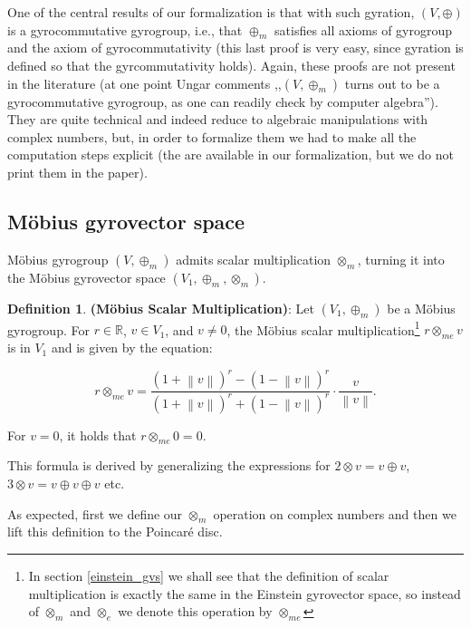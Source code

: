 \documentclass[a4paper]{article}
\theoremstyle{definition}
\newtheorem{definition}{Definition}[section]
\newcommand{\norm}[1]{\left\lVert#1\right\rVert}
\begin{document}
One of the central results of our formalization is that with such
gyration, $(V, \oplus)$ is a gyrocommutative gyrogroup, i.e., that
$\oplus_m$ satisfies all axioms of gyrogroup and the axiom of
gyrocommutativity (this last proof is very easy, since gyration is
defined so that the gyrcommutativity holds). Again, these proofs are
not present in the literature (at one point Ungar comments
,,$(V, \oplus_m)$ turns out to be a gyrocommutative gyrogroup, as one
can readily check by computer algebra''). They are quite technical and
indeed reduce to algebraic manipulations with complex numbers, but, in
order to formalize them we had to make all the computation steps
explicit (the are available in our formalization, but we do not print
them in the paper).


\subsection{M\"obius gyrovector space}

M\" obius gyrogroup $(V, \oplus_m)$ admits scalar multiplication
$\otimes_m$, turning it into the M\" obius gyrovector space
$(V_1, \oplus_m, \otimes_m)$.

\begin{definition}\textbf{(M\" obius Scalar Multiplication)}: Let
  $(V_1, \oplus_m)$ be a M\" obius gyrogroup. For $r \in \mathbb{R}$,
  $v \in V_1$, and $v \neq 0$, the M\" obius scalar
  multiplication\footnote{In section \ref{einstein_gvs} we shall see
    that the definition of scalar multiplication is exactly the same
    in the Einstein gyrovector space, so instead of $\otimes_m$ and
    $\otimes_e$ we denote this operation by $\otimes_{me}$}
  $r\otimes_{me} v$ is in $V_1$ and is given by the equation:
  
  $$r\otimes_{me} v = \frac{(1+\norm{v})^r - (1-\norm{v})^r}{(1+\norm{v})^r + (1-\norm{v})^r}\cdot\frac{v}{\norm{v}}.$$
  

\noindent For $v=0$, it holds that $r\otimes_{me} 0 = 0$.
\end{definition}

This formula is derived by generalizing the expressions for
$2\otimes v = v \oplus v$, $3\otimes v = v \oplus v \oplus v$ etc.

As expected, first we define our $\otimes_m$ operation on complex
numbers and then we lift this definition to the Poincar\'e disc.
\end{document}

